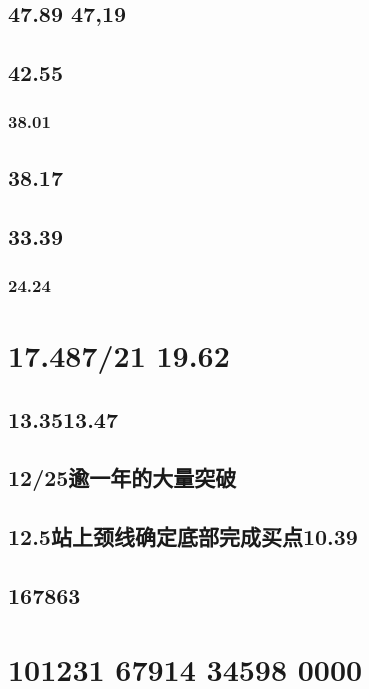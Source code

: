 \documentclass{article}
\begin{document}
\subsection{47.89 47,19}

\subsection{42.55}

\subsubsection{38.01}

\subsection{38.17}

\subsection{33.39}

\subsubsection{24.24}

\section{17.487/21 19.62}

\subsection{13.3513.47}

\subsection{12/25逾一年的大量突破}

\subsection{12.5站上颈线确定底部完成买点10.39}

\subsection{167863}

\section{101231 67914 34598 0000}
\end{document}
